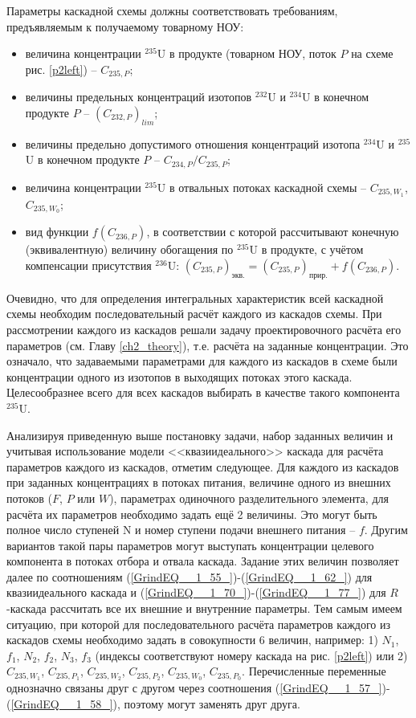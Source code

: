 Параметры каскадной схемы должны соответствовать требованиям, предъявляемым к получаемому товарному НОУ:

\begin{itemize}
    \item величина концентрации $^{235}$U в продукте (товарном НОУ, поток $P$ на схеме рис. \ref{p2left}) -- $C_{235,{P}}$;
    \item величины предельных концентраций изотопов $^{232}$U и $^{234}$U в конечном продукте $P$ -- $(C_{232,{P}})_{lim}$;
    \item величины предельно допустимого отношения концентраций изотопа $^{234}$U и $^{235}$U в конечном продукте $P$ -- ${C_{234,{P}}}/{C_{235,{P}}}$;
    \item величина концентрации $^{235}$U в отвальных потоках каскадной схемы -- $C_{235,{W_1}}$, $C_{235,{W_0}}$;
    \item вид функции $f(C_{236,P})$, в соответствии с которой рассчитывают конечную (эквивалентную) величину обогащения по $^{235}$U в продукте, с учётом компенсации присутствия $^{236}$U:
    $(C_{235,P})_\textit{экв.}=(C_{235,P})_\textit{прир.}+f(C_{236,P})$.    
\end{itemize}

Очевидно, что для определения интегральных характеристик всей каскадной схемы необходим последовательный расчёт каждого из каскадов схемы. При рассмотрении каждого из каскадов решали задачу проектировочного расчёта его параметров (см. Главу \ref{ch2_theory}), т.е. расчёта на заданные концентрации. Это означало, что задаваемыми параметрами для каждого из каскадов в схеме были концентрации одного из изотопов в выходящих потоках этого каскада. Целесообразнее всего для всех каскадов выбирать в качестве такого компонента $^{235}$U.

Анализируя приведенную выше постановку задачи, набор заданных величин и учитывая использование модели <<квазиидеального>> каскада для расчёта параметров каждого из каскадов, отметим следующее. Для каждого из каскадов при заданных концентрациях в потоках питания, величине одного из внешних потоков ($F$, $P$ или $W$), параметрах одиночного разделительного элемента, для расчёта их параметров необходимо задать ещё 2 величины. Это могут быть полное число ступеней N и номер ступени подачи внешнего питания -- $f$. Другим вариантов такой пары параметров могут выступать концентрации целевого компонента в потоках отбора и отвала каскада. Задание этих величин позволяет далее по соотношениям (\ref{GrindEQ__1_55_})-(\ref{GrindEQ__1_62_}) для квазиидеального каскада и (\ref{GrindEQ__1_70_})-(\ref{GrindEQ__1_77_}) для $R$-каскада рассчитать все их внешние и внутренние параметры. Тем самым имеем ситуацию, при которой для последовательного расчёта параметров каждого из каскадов схемы необходимо задать в совокупности 6 величин, например: 1) $N_1$, $f_1$, $N_2$, $f_2$, $N_3$, $f_3$ (индексы соответствуют номеру каскада на рис. \ref{p2left}) или 2) $C_{235,{W_1}}$, $C_{235,{P_1}}$, $C_{235,{W_2}}$, $C_{235,{P_2}}$, $C_{235,{W_0}}$, $C_{235,{P_0}}$. Перечисленные переменные однозначно связаны друг с другом через соотношения (\ref{GrindEQ__1_57_})-(\ref{GrindEQ__1_58_}), поэтому могут заменять друг друга. 

